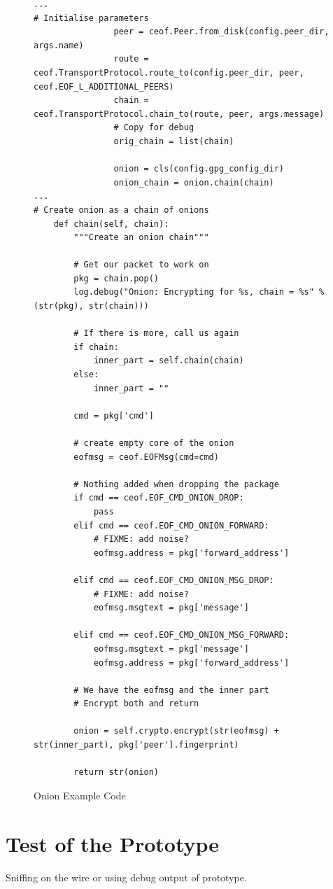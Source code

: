 \begin{figure}[htb]
\caption{Onion Example Code}
\label{onionexample}
\begin{verbatim}
...
# Initialise parameters
                peer = ceof.Peer.from_disk(config.peer_dir, args.name)
                route = ceof.TransportProtocol.route_to(config.peer_dir, peer, ceof.EOF_L_ADDITIONAL_PEERS)
                chain = ceof.TransportProtocol.chain_to(route, peer, args.message)
                # Copy for debug
                orig_chain = list(chain)

                onion = cls(config.gpg_config_dir)
                onion_chain = onion.chain(chain)
...
# Create onion as a chain of onions
    def chain(self, chain):
        """Create an onion chain"""

        # Get our packet to work on
        pkg = chain.pop()
        log.debug("Onion: Encrypting for %s, chain = %s" % (str(pkg), str(chain)))

        # If there is more, call us again
        if chain:
            inner_part = self.chain(chain)
        else:
            inner_part = ""

        cmd = pkg['cmd']

        # create empty core of the onion
        eofmsg = ceof.EOFMsg(cmd=cmd)

        # Nothing added when dropping the package
        if cmd == ceof.EOF_CMD_ONION_DROP:
            pass
        elif cmd == ceof.EOF_CMD_ONION_FORWARD:
            # FIXME: add noise?
            eofmsg.address = pkg['forward_address']

        elif cmd == ceof.EOF_CMD_ONION_MSG_DROP:
            # FIXME: add noise?
            eofmsg.msgtext = pkg['message']
            
        elif cmd == ceof.EOF_CMD_ONION_MSG_FORWARD:
            eofmsg.msgtext = pkg['message']
            eofmsg.address = pkg['forward_address']

        # We have the eofmsg and the inner part
        # Encrypt both and return

        onion = self.crypto.encrypt(str(eofmsg) + str(inner_part), pkg['peer'].fingerprint)

        return str(onion)
\end{verbatim}
\end{figure}
\section{Test of the Prototype}
Sniffing on the wire or using debug output of prototype.
